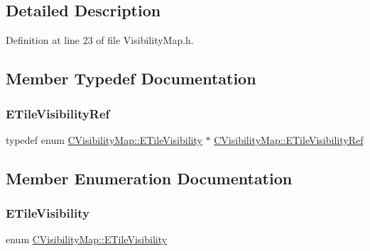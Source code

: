 \subsection{Detailed Description}


Definition at line 23 of file Visibility\+Map.\+h.



\subsection{Member Typedef Documentation}
\hypertarget{classCVisibilityMap_a6cf5b0323092b90b86a6d3d8778b4fb1}{}\label{classCVisibilityMap_a6cf5b0323092b90b86a6d3d8778b4fb1} 
\subsubsection{\texorpdfstring{E\+Tile\+Visibility\+Ref}{ETileVisibilityRef}}
{\footnotesize\ttfamily typedef  enum \hyperlink{classCVisibilityMap_a6665f905da08825adbb0eee7bd1f2f30}{C\+Visibility\+Map\+::\+E\+Tile\+Visibility} $\ast$ \hyperlink{classCVisibilityMap_a6cf5b0323092b90b86a6d3d8778b4fb1}{C\+Visibility\+Map\+::\+E\+Tile\+Visibility\+Ref}}



\subsection{Member Enumeration Documentation}
\hypertarget{classCVisibilityMap_a6665f905da08825adbb0eee7bd1f2f30}{}\label{classCVisibilityMap_a6665f905da08825adbb0eee7bd1f2f30} 
\subsubsection{\texorpdfstring{E\+Tile\+Visibility}{ETileVisibility}}
{\footnotesize\ttfamily enum \hyperlink{classCVisibilityMap_a6665f905da08825adbb0eee7bd1f2f30}{C\+Visibility\+Map\+::\+E\+Tile\+Visibility}}


